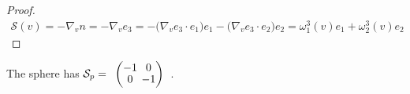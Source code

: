 \documentclass[10pt]{article}
\begin{document}
            \begin{proof}
                \begin{equation*}
                    \begin{aligned}
                        \mathcal{S}(v) = -\nabla_{v}n = -\nabla_{v}e_3 = -\big(\nabla_{v}e_3\cdot e_1\big)e_1 -\big(\nabla_{v}e_3\cdot e_2\big)e_2 = \omega_1^3(v)e_1 + \omega_2^3(v)e_2
                    \end{aligned}
                \end{equation*}
            \end{proof}
            \begin{example}
                The sphere has $\mathcal{S}_p = 
                \normalsize{
                    \begin{array}{lc}
                        \setlength{\arraycolsep}{2pt}
                        \begingroup
                        \renewcommand*{\arraystretch}{0.89}
                        \begin{pmatrix}
                            -1 & 0 \\
                            0 & -1 \\
                        \end{pmatrix}
                        \endgroup
                    \end{array}
                }$.
            \end{example}
\end{document}
